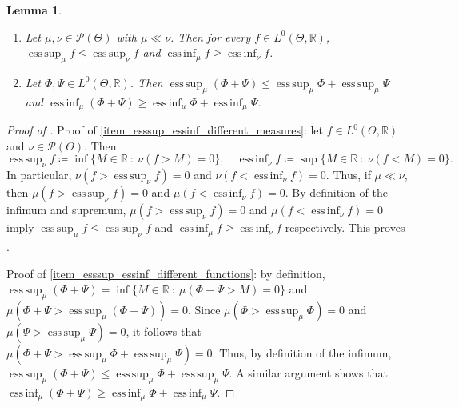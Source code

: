 \documentclass[a4paper]{scrartcl}
\newtheorem{lemma}[theorem]{Lemma}
\theoremstyle{definition}
\numberwithin{equation}{section}
\newcommand{\R}{\mathbb{R}}
\DeclareMathOperator*{\essinf}{ess\,inf}
\DeclareMathOperator*{\esssup}{ess\,sup}
\begin{document}
\begin{lemma}
 \label{lemma_esssup_essinf_different_measures_different_functions}
\begin{enumerate}
 \item \label{item_esssup_essinf_different_measures}
Let $\mu,\nu\in\mathcal{P}(\Theta)$ with $\mu\ll \nu$. Then for every $f\in L^0(\Theta,\R)$, $\esssup_{\mu}f \leq \esssup_\nu f$ and $\essinf_{\mu} f\geq \essinf_\nu f$.
\item \label{item_esssup_essinf_different_functions}
Let $\Phi,\Psi\in L^0(\Theta,\R)$. Then $\esssup_\mu(\Phi+\Psi)\leq \esssup_\mu\Phi+\esssup_\mu \Psi$ and $\essinf_\mu(\Phi+\Psi)\geq \essinf_\mu \Phi+\essinf_\mu\Psi$.
\end{enumerate}
\end{lemma}
\begin{proof}[Proof of ]
 Proof of \cref{item_esssup_essinf_different_measures}: let $f\in L^0(\Theta,\R)$ and $\nu\in\mathcal{P}(\Theta)$. Then
 \begin{equation*}
  \esssup_\nu f\coloneqq \inf\{M\in\R\ :\ \nu(f>M)=0 \},\quad \essinf_\nu f\coloneqq \sup\{M\in\R\ :\ \nu(f<M)=0 \}.
 \end{equation*}
 In particular, $\nu(f>\esssup_\nu f)=0$ and $\nu(f<\essinf_\nu f)=0$.
Thus, if $\mu\ll \nu$, then $\mu(f>\esssup_\nu f)=0$ and $\mu(f<\essinf_\nu f)=0$. 
By definition of the infimum and supremum, $\mu(f>\esssup_\nu f)=0$ and $\mu(f<\essinf_\nu f)=0$ imply $\esssup_{\mu}f \leq \esssup_\nu f$ and $\essinf_{\mu} f\geq \essinf_\nu f$ respectively. 
This proves .

Proof of \cref{item_esssup_essinf_different_functions}: by definition, $\esssup_\mu (\Phi+\Psi)=\inf\{M\in\R\ :\ \mu(\Phi+\Psi>M)=0\}$ and $\mu(\Phi+\Psi>\esssup_\mu(\Phi+\Psi))=0$. 
Since $\mu(\Phi>\esssup_\mu\Phi)=0$ and $\mu(\Psi>\esssup_\mu\Psi)=0$, it follows that $\mu(\Phi+\Psi>\esssup_\mu\Phi+\esssup_\mu\Psi)=0$. Thus, by definition of the infimum, $\esssup_\mu(\Phi+\Psi)\leq \esssup_\mu\Phi+\esssup_\mu \Psi$. A similar argument shows that $\essinf_\mu(\Phi+\Psi)\geq \essinf_\mu \Phi+\essinf_\mu\Psi$.
\end{proof}
\end{document}
